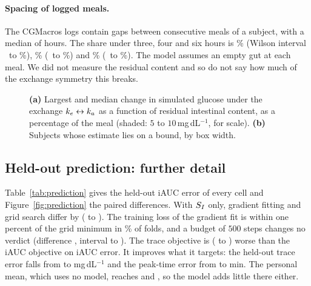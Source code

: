 \paragraph{Spacing of logged meals.}\label{apx:phase13}
The CGMacros logs contain \resOverlapGaps{} gaps between consecutive meals of a subject, with a median of
\resOverlapMedianGap{} hours. The share under three, four and six hours is \resOverlapWithinThree\% (Wilson interval
\resOverlapWithinThreeLow\ to \resOverlapWithinThreeHigh\%), \resOverlapWithinFour\% (\resOverlapWithinFourLow\ to
\resOverlapWithinFourHigh\%) and \resOverlapWithinSix\% (\resOverlapWithinSixLow\ to \resOverlapWithinSixHigh\%).
The model assumes an empty gut at each meal. We did not measure the residual content and so do not say how much of
the exchange symmetry this breaks.

\begin{figure}[tbp]
\centering
{}
\caption{\textbf{(a)} Largest and median change in simulated glucose under the exchange $k_e\leftrightarrow k_a$
as a function of residual intestinal content, as a percentage of the meal (shaded: $5$ to $10$\,mg\,dL$^{-1}$, for scale).
\textbf{(b)} Subjects whose estimate lies on a bound, by box width.}
\label{fig:gutsweep}
\end{figure}

\subsection{Held-out prediction: further detail}
\label{apx:prediction}

Table~\ref{tab:prediction} gives the held-out iAUC error of every cell and Figure~\ref{fig:prediction} the paired
differences. With $S_I$ only, gradient fitting and grid search differ by \resDiffGradOneVsGridOne{}
(\resDiffGradOneVsGridOneLow{} to \resDiffGradOneVsGridOneHigh). The training loss of the gradient fit is within one
percent of the grid minimum in \resGapWithinTolerance\% of folds, and a budget of $500$ steps changes no
verdict (difference \resStepsGradThreeFiveHundredVsGridThree{}, interval
\resStepsGradThreeFiveHundredVsGridThreeLow{} to \resStepsGradThreeFiveHundredVsGridThreeHigh). The trace objective is
\resDiffGradThreeTraceVsGradThree{} (\resDiffGradThreeTraceVsGradThreeLow{} to \resDiffGradThreeTraceVsGradThreeHigh)
worse than the iAUC objective on iAUC error. It improves what it targets: the held-out trace error falls from
\resTraceRmseGradThree{} to \resTraceRmseGradThreeTrace{} mg\,dL$^{-1}$ and the peak-time error from
\resPeakGradThree{} to \resPeakGradThreeTrace{} min. The personal mean, which uses no model, reaches
\resTraceRmsePersonalMean{} and \resPeakPersonalMean{}, so the model adds little there either.

